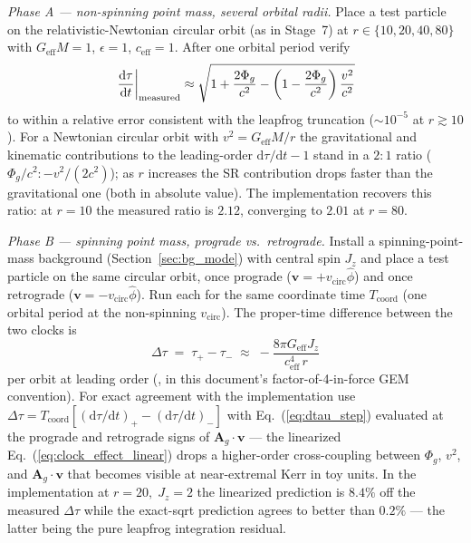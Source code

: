 \documentclass[11pt,a4paper]{article}
\newcommand{\vv}[1]{\mathbf{#1}}
\newcommand{\Phig}{\Phi_g}
\newcommand{\Ag}{\vv{A}_g}
\newcommand{\dd}{\mathrm{d}}
\begin{document}
\emph{Phase A — non-spinning point mass, several orbital radii.}  Place a
test particle on the relativistic-Newtonian circular orbit (as in Stage~7)
at $r \in \{10, 20, 40, 80\}$ with $G_{\mathrm{eff}}M = 1$, $\epsilon = 1$,
$c_{\mathrm{eff}} = 1$.  After one orbital period verify
\begin{equation}
  \left.\frac{\dd\tau}{\dd t}\right|_{\rm measured}
  \approx \sqrt{1 + \frac{2\Phig}{c^2} - \left(1-\frac{2\Phig}{c^2}\right)\frac{v^2}{c^2}}
\end{equation}
to within a relative error consistent with the leapfrog truncation
($\sim 10^{-5}$ at $r \gtrsim 10$).  For a Newtonian circular orbit with
$v^2 = G_{\mathrm{eff}}M/r$ the gravitational and kinematic contributions
to the leading-order $\dd\tau/\dd t - 1$ stand in a $2:1$ ratio
($\Phig/c^2 : -v^2/(2c^2)$); as $r$ increases the SR contribution drops
faster than the gravitational one (both in absolute value).  The
implementation recovers this ratio: at $r=10$ the measured ratio is
$2.12$, converging to $2.01$ at $r=80$.

\emph{Phase B — spinning point mass, prograde vs.\ retrograde.}  Install a
spinning-point-mass background (Section~\ref{sec:bg_mode}) with central
spin $J_z$ and place a test particle on the same circular orbit, once
prograde ($\vv{v} = +v_{\mathrm{circ}}\hat\phi$) and once retrograde
($\vv{v} = -v_{\mathrm{circ}}\hat\phi$).  Run each for the same coordinate
time $T_{\mathrm{coord}}$ (one orbital period at the non-spinning
$v_{\mathrm{circ}}$).  The proper-time difference between the two clocks is
\begin{equation}
\label{eq:clock_effect_linear}
  \Delta\tau \;=\; \tau_+ - \tau_- \;\approx\; -\frac{8\pi G_{\mathrm{eff}} J_z}{c_{\mathrm{eff}}^4\,r}
\end{equation}
per orbit at leading order (\cite{CohenMashhoon1993}, in this document's
factor-of-4-in-force GEM convention).  For exact agreement with the
implementation use
$\Delta\tau = T_{\mathrm{coord}}\!\left[(\dd\tau/\dd t)_+ - (\dd\tau/\dd
t)_-\right]$ with Eq.~(\ref{eq:dtau_step}) evaluated at the prograde and
retrograde signs of $\Ag\!\cdot\!\vv{v}$ — the linearized
Eq.~(\ref{eq:clock_effect_linear}) drops a higher-order cross-coupling
between $\Phig$, $v^2$, and $\Ag\!\cdot\!\vv{v}$ that becomes visible at
near-extremal Kerr in toy units.  In the implementation at
$r=20,\;J_z=2$ the linearized prediction is $8.4\%$ off the measured
$\Delta\tau$ while the exact-sqrt prediction agrees to better than
$0.2\%$ — the latter being the pure leapfrog integration residual.
\end{document}
